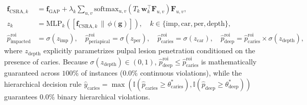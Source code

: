 \documentclass[review]{elsarticle}
\begin{document}
\begin{enumerate}
    \begin{align}
        \mathbf{f}_{\text{CSRA}, k} &= \mathbf{f}_{\text{GAP}} + \lambda_k \sum_{u,v} \text{softmax}_{u,v}\!\left(T_k\,\mathbf{w}_k^{\top}\mathbf{F}_{u,v}\right)\mathbf{F}_{u,v}, \nonumber \\
        z_k &= \text{MLP}_k\!\left([\mathbf{f}_{\text{CSRA}, k} \,\|\, \phi(\mathbf{g})]\right), \quad k \in \{\text{imp}, \text{car}, \text{per}, \text{depth}\}, \nonumber \\
        \hat{p}^{\text{roi}}_{\text{impacted}} &= \sigma(z_{\text{imp}}), \quad \hat{p}^{\text{roi}}_{\text{periapical}} = \sigma(z_{\text{per}}), \quad \hat{p}^{\text{roi}}_{\text{caries}} = \sigma(z_{\text{car}}), \quad \hat{p}^{\text{roi}}_{\text{deep}} = \hat{p}^{\text{roi}}_{\text{caries}} \times \sigma(z_{\text{depth}}),
        \label{eq:hierarchical_head}
    \end{align}
    where $z_{\text{depth}}$ explicitly parametrizes pulpal lesion penetration conditioned on the presence of caries. Because $\sigma(z_{\text{depth}}) \in (0, 1)$, $\hat{p}^{\text{roi}}_{\text{deep}} \le \hat{p}^{\text{roi}}_{\text{caries}}$ is mathematically guaranteed across $100\%$ of instances ($0.0\%$ continuous violations), while the hierarchical decision rule $\hat{y}_{\text{caries}} = \max(\mathbb{I}(\hat{p}_{\text{caries}} \ge \theta^*_{\text{caries}}), \mathbb{I}(\hat{p}_{\text{deep}} \ge \theta^*_{\text{deep}}))$ guarantees $0.0\%$ binary hierarchical violations.
\end{enumerate}
\end{document}
